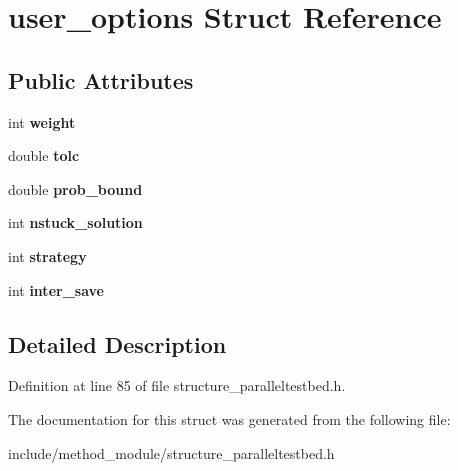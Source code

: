 \hypertarget{structuser__options}{\section{user\-\_\-options Struct Reference}
\label{structuser__options}
}
\subsection*{Public Attributes}
\begin{DoxyCompactItemize}
\item 
\hypertarget{structuser__options_a15d45597f273f686348b72fd1f53350d}{int {\bfseries weight}}\label{structuser__options_a15d45597f273f686348b72fd1f53350d}

\item 
\hypertarget{structuser__options_ac77487164984d72a1c8e145e886210eb}{double {\bfseries tolc}}\label{structuser__options_ac77487164984d72a1c8e145e886210eb}

\item 
\hypertarget{structuser__options_a24bd7e8ba1f5f49338ae17f33f2b56e8}{double {\bfseries prob\-\_\-bound}}\label{structuser__options_a24bd7e8ba1f5f49338ae17f33f2b56e8}

\item 
\hypertarget{structuser__options_a9221649496b6206e57e743dd37288b5f}{int {\bfseries nstuck\-\_\-solution}}\label{structuser__options_a9221649496b6206e57e743dd37288b5f}

\item 
\hypertarget{structuser__options_a3713423db4962a298c869623b22c1794}{int {\bfseries strategy}}\label{structuser__options_a3713423db4962a298c869623b22c1794}

\item 
\hypertarget{structuser__options_abc96f84f16a47f756b4dad86ea7ccf5e}{int {\bfseries inter\-\_\-save}}\label{structuser__options_abc96f84f16a47f756b4dad86ea7ccf5e}

\end{DoxyCompactItemize}


\subsection{Detailed Description}


Definition at line 85 of file structure\-\_\-paralleltestbed.\-h.



The documentation for this struct was generated from the following file\-:\begin{DoxyCompactItemize}
\item 
include/method\-\_\-module/structure\-\_\-paralleltestbed.\-h\end{DoxyCompactItemize}
